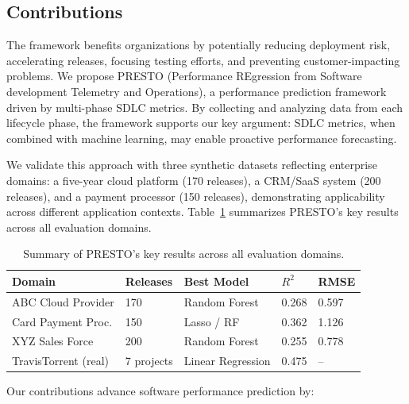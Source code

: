 \documentclass[technologies,article,submit,pdftex,moreauthors]{Definitions/mdpi}
\begin{document}
\subsection{Contributions}\label{sec:contributions}

The framework benefits organizations by potentially reducing deployment
risk, accelerating releases, focusing testing efforts, and preventing
customer-impacting problems. We propose PRESTO (Performance REgression
from Software development Telemetry and Operations), a performance
prediction framework driven by multi-phase SDLC metrics. By collecting
and analyzing data from each lifecycle phase, the framework supports our
key argument: SDLC metrics, when combined with machine learning, may
enable proactive performance forecasting.

We validate this approach with three synthetic datasets reflecting
enterprise domains: a five-year cloud platform (170 releases), a
CRM/SaaS system (200 releases), and a payment processor (150 releases),
demonstrating applicability across different application contexts.
Table~\ref{tab:summary_results} summarizes PRESTO's key results
across all evaluation domains.

{\def\LTcaptype{none} %
\begin{table}[H]
\centering
\caption{Summary of PRESTO's key results across all evaluation domains.\label{tab:summary_results}}
\begin{tabular}{@{}lllll@{}}
\toprule
\textbf{Domain} & \textbf{Releases} & \textbf{Best Model} &
\textbf{\(R^2\)} & \textbf{RMSE} \\
\midrule
ABC Cloud Provider & 170 & Random Forest & 0.268 & 0.597 \\
Card Payment Proc. & 150 & Lasso / RF & 0.362 & 1.126 \\
XYZ Sales Force & 200 & Random Forest & 0.255 & 0.778 \\
TravisTorrent (real) & 7 projects & Linear Regression & 0.475 & -- \\
\bottomrule
\end{tabular}
\end{table}
}

Our contributions advance software performance prediction by:
\end{document}
